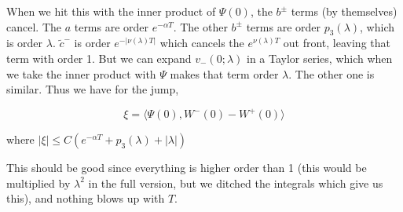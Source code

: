 \documentclass[12pt]{article}
\begin{document}
\begin{enumerate}
When we hit this with the inner product of $\Psi(0)$, the $b^\pm$ terms (by themselves) cancel. The $a$ terms are order $e^{-\alpha T}$. The other $b^\pm$ terms are order $p_3(\lambda)$, which is order $\lambda$. $\tilde{c}^-$ is order $e^{-|\nu(\lambda)T|}$ which cancels the $e^{\nu(\lambda)T}$ out front, leaving that term with order 1. But we can expand $v_-(0; \lambda)$ in a Taylor series, which when we take the inner product with $\Psi$ makes that term order $\lambda$. The other one is similar. Thus we have for the jump,

\[
\xi = \langle \Psi(0), W^-(0) - W^+(0) \rangle
\]

where $|\xi| \leq C( e^{-\alpha T} + p_3(\lambda) + |\lambda| )$

This should be good since everything is higher order than 1 (this would be multiplied by $\lambda^2$ in the full version, but we ditched the integrals which give us this), and nothing blows up with $T$.



\end{enumerate}
\end{document}

